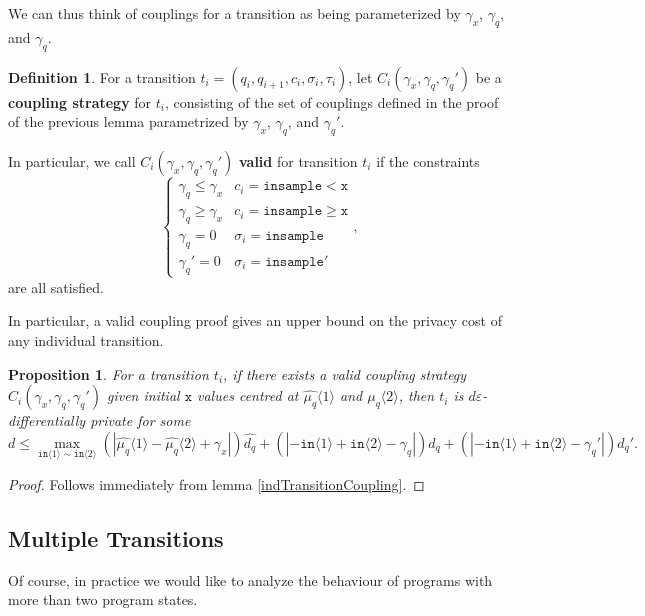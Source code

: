 \documentclass[12pt]{article}
\newcommand{\gguard}[1][x]{\texttt{insample}\geq #1}
\newcommand{\lguard}[1][x]{\texttt{insample} < #1}
\newcommand{\brangle}[1]{\langle #1 \rangle}
\newtheorem{prop}[thm]{Proposition}
\theoremstyle{definition}
\newtheorem{defn}[thm]{Definition}
\begin{document}
We can thus think of couplings for a transition as being parameterized by $\gamma_x$, $\gamma_q$, and $\gamma_q$. 

\begin{defn}
    For a transition $t_i = (q_i, q_{i+1}, c_i, \sigma_i, \tau_i)$, let $C_i(\gamma_x, \gamma_q, \gamma_q')$ be a \textbf{coupling strategy} for $t_i$, consisting of the set of couplings defined in the proof of the previous lemma parametrized by $\gamma_x$, $\gamma_q$, and $\gamma_q'$. 

    In particular, we call $C_i(\gamma_x, \gamma_q, \gamma_q')$ \textbf{valid} for transition $t_i$ if the constraints \[
        \begin{cases}
          \gamma_q\leq\gamma_x & c_i = \lguard[\texttt{x}]\\
          \gamma_q\geq\gamma_x & c_i = \gguard[\texttt{x}]\\
          \gamma_q=0 & \sigma_i = \texttt{insample}\\
          \gamma_q'=0 & \sigma_i = \texttt{insample}'
        \end{cases},
      \]
      are all satisfied. 
\end{defn}

In particular, a valid coupling proof gives an upper bound on the privacy cost of any individual transition. 
\begin{prop}\label{indivTransitionCouplingProp}
    For a transition $t_i$, if there exists a valid coupling strategy $C_i(\gamma_x, \gamma_q, \gamma_q')$ given initial $\texttt{x}$ values centred at $\hat{\mu_q}\brangle{1}$ and $\hat{\mu_q}\brangle{2}$, then $t_i$ is $d\varepsilon$-differentially private for some 
    \[d\leq \max_{\texttt{in}\brangle{1}\sim\texttt{in}\brangle{2}} (|\hat{\mu_q}\brangle{1}-\hat{\mu_q}\brangle{2}+\gamma_x|)\hat{d_q}+(|-\texttt{in}\brangle{1}+\texttt{in}\brangle{2}-\gamma_q|)d_q+(|-\texttt{in}\brangle{1}+\texttt{in}\brangle{2}-\gamma_q'|)d_q'.\]
\end{prop}
\begin{proof}
    Follows immediately from lemma \ref{indTransitionCoupling}.
\end{proof}

\subsection{Multiple Transitions}

Of course, in practice we would like to analyze the behaviour of programs with more than two program states.
\end{document}
